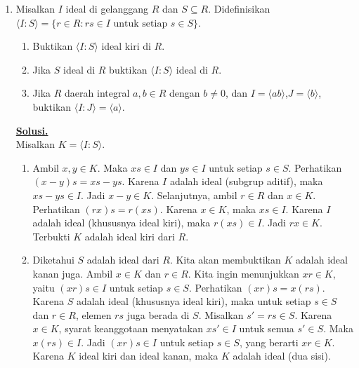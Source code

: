 \documentclass[12pt,twoside]{article}
\newenvironment{solution}
{
	\par\noindent\textbf{\underline{Solusi.}}\\
}
{
	\par
}
\begin{document}
\begin{enumerate}
  \item Misalkan $I$ ideal di gelanggang $R$ dan $S\subseteq R$. Didefinisikan $\langle I:S\rangle=\{r\in R:rs\in I\text  { untuk setiap } s\in S\}$.
        \begin{enumerate}
          \item [(a)] Buktikan $\langle I:S\rangle$ ideal kiri di $R$.
          \item[(b)] Jika $S$ ideal di $R$ buktikan $\langle I:S\rangle$ ideal di $R$.
          \item[(c)] Jika $R$ daerah integral $a,b\in R$ dengan $b\neq 0$, dan $I=\langle ab\rangle$,$J=\langle b\rangle$, buktikan $\langle I:J\rangle=\langle a\rangle$.
        \end{enumerate}
        \begin{solution}
          Misalkan $K = \langle I:S \rangle$.
          \begin{enumerate}
            \item[(a)] Ambil $x, y \in K$. Maka $xs \in I$ dan $ys \in I$ untuk setiap $s \in S$.
                  Perhatikan $(x-y)s = xs - ys$. Karena $I$ adalah ideal (subgrup aditif), maka $xs-ys \in I$.
                  Jadi $x-y \in K$.
                  Selanjutnya, ambil $r \in R$ dan $x \in K$.
                  Perhatikan $(rx)s = r(xs)$.
                  Karena $x \in K$, maka $xs \in I$. Karena $I$ adalah ideal (khususnya ideal kiri), maka $r(xs) \in I$.
                  Jadi $rx \in K$.
                  Terbukti $K$ adalah ideal kiri dari $R$.

            \item[(b)] Diketahui $S$ adalah ideal dari $R$. Kita akan membuktikan $K$ adalah ideal kanan juga.
                  Ambil $x \in K$ dan $r \in R$. Kita ingin menunjukkan $xr \in K$, yaitu $(xr)s \in I$ untuk setiap $s \in S$.
                  Perhatikan $(xr)s = x(rs)$.
                  Karena $S$ adalah ideal (khususnya ideal kiri), maka untuk setiap $s \in S$ dan $r \in R$, elemen $rs$ juga berada di $S$. Misalkan $s' = rs \in S$.
                  Karena $x \in K$, syarat keanggotaan menyatakan $xs' \in I$ untuk semua $s' \in S$.
                  Maka $x(rs) \in I$.
                  Jadi $(xr)s \in I$ untuk setiap $s \in S$, yang berarti $xr \in K$.
                  Karena $K$ ideal kiri dan ideal kanan, maka $K$ adalah ideal (dua sisi).


\end{enumerate}
\end{solution}
\end{enumerate}
\end{document}
